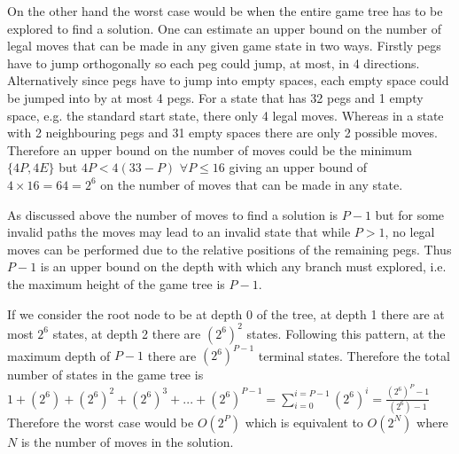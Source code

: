 \documentclass[12pt,a4paper]{report}
\begin{document}
On the other hand the worst case would be when the entire game tree has to be explored to find a solution. One can estimate an upper bound on the number of legal moves that can be made in any given game state in two ways. Firstly pegs have to jump orthogonally so each peg could jump, at most, in 4 directions. Alternatively since pegs have to jump into empty spaces, each empty space could be jumped into by at most 4 pegs. For a state that has 32 pegs and 1 empty space, e.g. the standard start state, there only 4 legal moves. Whereas in a state with 2 neighbouring pegs and 31 empty spaces there are only 2 possible moves. Therefore an upper bound on the number of moves could be the minimum$\{4P,4E\}$ but $4P<4(33-P)$ $\forall P\leq16$ giving an upper bound of $4\times16=64=2^6$ on the number of moves that can be made in any state.

As discussed above the number of moves to find a solution is $P-1$ but for some invalid paths the moves may lead to an invalid state that while $P>1$, no legal moves can be performed due to the relative positions of the remaining pegs. Thus $P-1$ is an upper bound on the depth with which any branch must explored, i.e. the maximum height of the game tree is $P-1$.

If we consider the root node to be at depth $0$ of the tree, at depth 1 there are at most $2^6$ states, at depth 2 there are $(2^6)^2$ states. Following this pattern, at the maximum depth of $P-1$ there are $(2^6)^{P-1}$ terminal states. Therefore the total number of states in the game tree is $1+(2^6)+(2^6)^2+(2^6)^3+...+(2^6)^{P-1}=\sum_{i=0}^{i=P-1} (2^6)^i=\frac{(2^6)^P-1}{(2^6)-1}$
Therefore the worst case would be $O(2^{P})$ which is equivalent to $O(2^{N})$ where $N$ is the number of moves in the solution.
\end{document}
